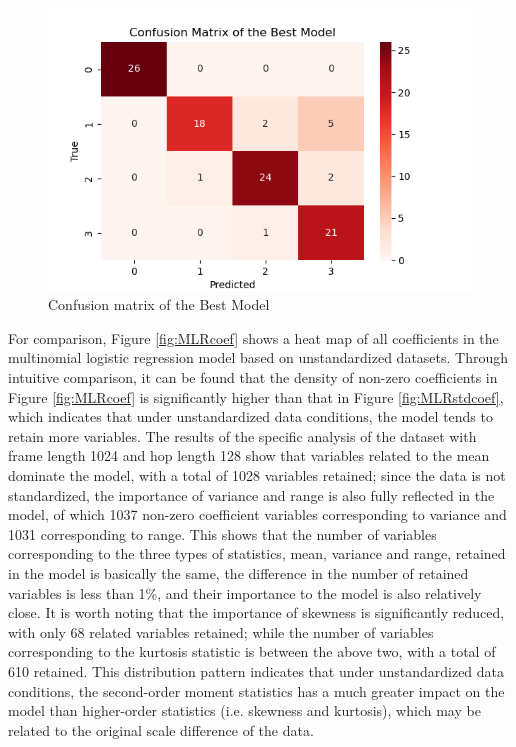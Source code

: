 \begin{figure}[H]
	\centering
	\includegraphics[width=0.9\linewidth]{../Statistical_Sciences_template/figure/Confusion matrix of the Best Model.png}
	\caption{Confusion matrix of the Best Model}
	\label{fig:CMMLRstd}
\end{figure}
\noindent For comparison, Figure \ref{fig:MLRcoef} shows a heat map of all coefficients in the multinomial logistic regression model based on unstandardized datasets. Through intuitive comparison, it can be found that the density of non-zero coefficients in Figure \ref{fig:MLRcoef} is significantly higher than that in Figure \ref{fig:MLRstdcoef}, which indicates that under unstandardized data conditions, the model tends to retain more variables. The results of the specific analysis of the dataset with frame length 1024 and hop length 128 show that variables related to the mean dominate the model, with a total of 1028 variables retained; since the data is not standardized, the importance of variance and range is also fully reflected in the model, of which 1037 non-zero coefficient variables corresponding to variance and 1031 corresponding to range. This shows that the number of variables corresponding to the three types of statistics, mean, variance and range, retained in the model is basically the same, the difference in the number of retained variables is less than 1\%, and their importance to the model is also relatively close. It is worth noting that the importance of skewness is significantly reduced, with only 68 related variables retained; while the number of variables corresponding to the kurtosis statistic is between the above two, with a total of 610 retained. This distribution pattern indicates that under unstandardized data conditions, the second-order moment statistics has a much greater impact on the model than higher-order statistics (i.e. skewness and kurtosis), which may be related to the original scale difference of the data.\\
